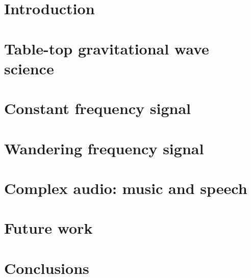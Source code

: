 \documentclass[aps,pra,superscriptaddress,reprint,nofootinbib]{revtex4-1}
\begin{document}
\maketitle

\section{Introduction}
\label{sec:introduction}



\section{Table-top gravitational wave science}
\label{sec:ifo}



\section{Constant frequency signal}
\label{sec:single_tone}


 
\section{Wandering frequency signal}
\label{sec:viterbi_wandering}



\section{Complex audio: music and speech}
\label{sec:optical_microphone}



\section{Future work}
\label{sec:future_work}



\section{Conclusions}
\label{sec:conclusions}

\end{document}
